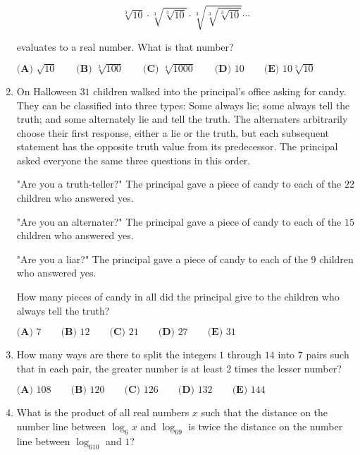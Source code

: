 \documentclass{article}
\begin{document}
\begin{enumerate}[label=\arabic*., itemsep=0.5em]
\begin{equation*}
\sqrt[3]{10} \cdot \sqrt[3]{\sqrt[3]{10}} \cdot \sqrt[3]{\sqrt[3]{\sqrt[3]{10}}} \cdots
\end{equation*}

evaluates to a real number. What is that number?

$\textbf{(A) }\sqrt{10}\qquad\textbf{(B) }\sqrt[3]{100}\qquad\textbf{(C) }\sqrt[4]{1000}\qquad\textbf{(D) }10\qquad\textbf{(E) }10\sqrt[3]{10}$\par \vspace{0.5em}\item On Halloween $31$ children walked into the principal's office asking for candy. They
can be classified into three types: Some always lie; some always tell the truth; and
some alternately lie and tell the truth. The alternaters arbitrarily choose their first
response, either a lie or the truth, but each subsequent statement has the opposite
truth value from its predecessor. The principal asked everyone the same three
questions in this order.

"Are you a truth-teller?" The principal gave a piece of candy to each of the $22$
children who answered yes.

"Are you an alternater?" The principal gave a piece of candy to each of the $15$
children who answered yes.

"Are you a liar?" The principal gave a piece of candy to each of the $9$ children who
answered yes.

How many pieces of candy in all did the principal give to the children who always
tell the truth?

$\textbf{(A) } 7 \qquad \textbf{(B) } 12 \qquad \textbf{(C) } 21 \qquad \textbf{(D) } 27 \qquad \textbf{(E) } 31$\par \vspace{0.5em}\item How many ways are there to split the integers $1$ through $14$ into $7$ pairs such that in each pair, the greater number is at least $2$ times the lesser number?

$\textbf{(A) } 108 \qquad \textbf{(B) } 120 \qquad \textbf{(C) } 126 \qquad \textbf{(D) } 132 \qquad \textbf{(E) } 144$\par \vspace{0.5em}\item What is the product of all real numbers $x$ such that the distance on the number line between $\log_6x$ and $\log_69$ is twice the distance on the number line between $\log_610$ and $1$?


\end{enumerate}
\end{document}
